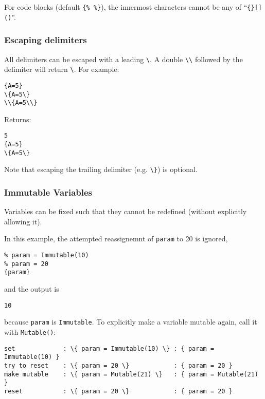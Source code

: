 For code blocks (default \texttt{\{\%\ \%\}}), the innermost characters
cannot be any of ``\texttt{\{\}{[}{]}()}''.

\subsubsection{Escaping delimiters}\label{interfaces:escaping-delimiters}

All delimiters can be escaped with a leading \texttt{\textbackslash{}}.
A double \texttt{\textbackslash{}\textbackslash{}} followed by the
delimiter will return \texttt{\textbackslash{}}. For example:

\begin{verbatim}
{A=5}
\{A=5\}
\\{A=5\\}
\end{verbatim}

Returns:

\begin{verbatim}
5
{A=5}
\{A=5\}  
\end{verbatim}

Note that escaping the trailing delimiter (e.g.
\texttt{\textbackslash{}\}}) is optional.

\subsubsection{Immutable Variables}\label{interfaces:immutable-variables}

Variables can be fixed such that they cannot be redefined (without
explicitly allowing it).

In this example, the attempted reassignemnt of \texttt{param} to 20 is
ignored,

\begin{verbatim}
% param = Immutable(10)
% param = 20 
{param}
\end{verbatim}

and the output is

\begin{verbatim}
10
\end{verbatim}

because \texttt{param} is \texttt{Immutable}. To explicitly make a
variable mutable again, call it with \texttt{Mutable()}:

\begin{verbatim}
set             : \{ param = Immutable(10) \} : { param = Immutable(10) }           
try to reset    : \{ param = 20 \}            : { param = 20 }          
make mutable    : \{ param = Mutable(21) \}   : { param = Mutable(21) } 
reset           : \{ param = 20 \}            : { param = 20 }         
\end{verbatim}

